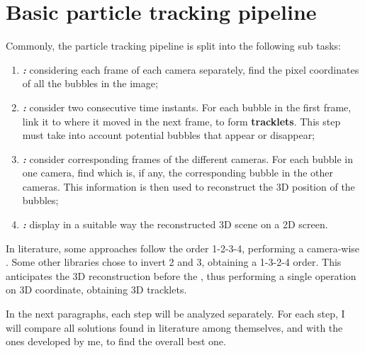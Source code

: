 \chapter{Basic particle tracking pipeline}
\label{chap:basicpipeline}

Commonly, the particle tracking pipeline is split into the following sub tasks:
\begin{enumerate}
	\itemsep 0em
	\item \textbf{\locate* \textit{:}} considering each frame of each camera separately, find the pixel coordinates of all the bubbles in the image;
	\item \textbf{\link* \textit{:}} consider two consecutive time instants. For each bubble in the first frame, link it to where it moved in the next frame, to form \textbf{tracklets}. This step must take into account potential bubbles that appear or disappear;
	\item \textbf{\match* \textit{:}} consider corresponding frames of the different cameras. For each bubble in one camera, find which is, if any, the corresponding bubble in the other cameras. This information is then used to reconstruct the 3D position of the bubbles;
	\item \textbf{\visual* \textit{:}} display in a suitable way the reconstructed 3D scene on a 2D screen.
\end{enumerate}
In literature, some approaches follow the order 1-2-3-4, performing a camera-wise \link*.
Some other libraries chose to invert 2 and 3, obtaining a 1-3-2-4 order.
This anticipates the 3D reconstruction before the \link*, thus performing a single \link* operation on 3D coordinate, obtaining 3D tracklets.

In the next paragraphs, each step will be analyzed separately.
For each step, I will compare all solutions found in literature among themselves, and with the ones developed by me, to find the overall best one.
